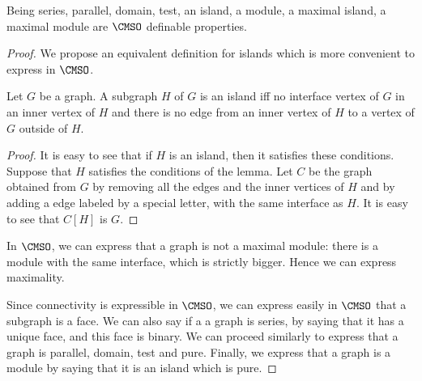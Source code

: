 \begin{proposition}\label{prop:pure-modules-are-CMSO}
Being series, parallel, domain, test, an island, a module, a maximal island, a maximal module are $\CMSO$ definable properties. 
\end{proposition}
\begin{proof} We propose an equivalent definition for islands which is more convenient to express in $\CMSO$.
\begin{lemma}\label{lem:module} Let $G$ be a graph. A  subgraph $H$ of $G$ is an island iff no interface vertex of $G$ in an inner vertex of $H$ and there is no edge from an inner vertex of $H$ to a vertex of $G$ outside of $H$.
\end{lemma}
\begin{proof}
It is easy to see that if $H$ is an island, then it satisfies  these conditions.
Suppose that $H$ satisfies the conditions of the lemma. Let $C$ be the graph obtained from $G$ by removing all the edges and the inner vertices of $H$ and by adding a edge labeled by a special letter, with the same interface as $H$. It is easy to see that $C[H]$ is $G$.
\end{proof}
In $\CMSO$, we can express that a graph is not a maximal module: there is a module with the same interface, which is strictly bigger. Hence we can express maximality.

Since connectivity is expressible in $\CMSO$, we can express easily in $\CMSO$ that a subgraph is a face. We can also say if a a graph is series, by saying that it has a unique face, and this face is binary. We can proceed similarly to express that a graph is parallel,  domain, test and pure. Finally, we express that a graph is a module by saying that it is an island which is pure.    
\end{proof}

